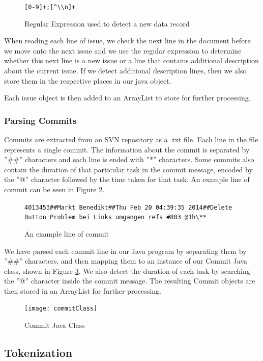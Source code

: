 \begin{figure}
\centering
\verb/[0-9]+;[^\\n]+/
\caption{Regular Expression used to detect a new data record}
\label{fig:regexp}
\end{figure}

When reading each line of issue, we check the next line in the document before we move onto the next issue and we use the regular expression to determine whether this next line is a new issue or a line that contains additional description about the current issue.
If we detect additional description lines, then we also store them in the respective places in our java object.

Each issue object is then added to an ArrayList to store for further processing.

\subsubsection{Parsing Commits}

Commits are extracted from an SVN repository as a .txt file.
Each line in the file represents a single commit.
The information about the commit is separated by ''\#\#'' characters and each line is ended with ''\**'' characters.
Some commits also contain the duration of that particular task in the commit message, encoded by the ''@'' character followed by the time taken for that task.
An example line of commit can be seen in Figure \ref{fig:commitLine}.

\begin{figure}
\centering
\verb/4013453##Markt Benedikt##Thu Feb 20 04:39:35 2014##Delete Button Problem bei Links umgangen refs #803 @1h\**  /
\caption{An example line of commit}
\label{fig:commitLine}
\end{figure}

We have parsed each commit line in our Java program by separating them by ''\#\#'' characters, and then mapping them to an instance of our Commit Java class, shown in Figure \ref{fig:commit}.
We also detect the duration of each task by searching the ''@'' character inside the commit message.
The resulting Commit objects are then stored in an ArrayList for further processing.

\begin{figure}
\centering
\texttt{[image: commitClass]}
\caption{Commit Java Class}
\label{fig:commit}
\end{figure}

\subsection{Tokenization}

